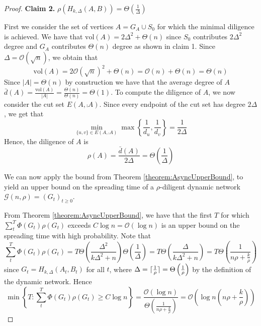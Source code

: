 \begin{proof}

	\textbf{Claim 2.} $\rho(H_{k, \Delta}(A,B)) = \Theta\left(\frac{1}{\Delta}\right)$

	First we consider the set of vertices $A = G_A \cup S_0$ for which the minimal diligence is achieved. %
	We have that $\text{vol}(A) = 2\Delta^2 + \Theta(n)$ since $S_0$ contributes $2\Delta^2$ degree and $G_A$ contributes $\Theta(n)$ degree as shown in claim 1. Since $\Delta = \mathcal{O}(\sqrt{n})$, we obtain that 
	$$
		\text{vol}(A) = 2 \mathcal{O}(\sqrt{n})^2 + \Theta(n) = \mathcal{O}(n) + \Theta(n) = \Theta(n)
	$$ %
	Since $|A| = \Theta(n)$ by construction we have that the average degree of $A$ $\bar{d}(A) = \frac{\text{vol}(A)}{|A|} = \frac{\Theta(n)}{\Theta(n)} = \Theta(1)$. To compute the diligence of $A$, we now consider the cut set $E(A, \comp{A})$. Since every endpoint of the cut set has degree $2\Delta$, we get that 
	$$
		\min_{\{u, v\} \in E(A, \comp{A})} \max \left\{ \frac{1}{d_u}, \frac{1}{d_v} \right\} = \frac{1}{2\Delta}
	$$
	Hence, the diligence of $A$ is 
	$$
		\rho(A) = \frac{\bar{d}(A)}{2\Delta} = \Theta\left(\frac{1}{\Delta}\right)
	$$ 


	We can now apply the bound from Theorem \ref{theorem:AsyncUpperBound}, to yield an upper bound on the spreading time of a $\rho$-diligent dynamic network $\mathcal{G}(n, \rho) = (G_t)_{t\geq 0}$. 
	
	From Theorem \ref{theorem:AsyncUpperBound}, we have that the first $T$ for which $\sum_t^T \Phi(G_t)\rho(G_t)$ exceeds $C \log n = \mathcal{O}(\log n)$ is an upper bound on the spreading time with high probability.  Note that 
	$$
		\sum_t^T \Phi(G_t)\rho(G_t)
		= 
		T \Theta\left(\frac{\Delta^2}{k\Delta^2 +n }\right) \Theta\left(\frac{1}{\Delta}\right)
		= 
		T \Theta\left(\frac{\Delta}{k\Delta^2 +n }\right)
		= 
		T \Theta\left(\frac{1}{n \rho + \frac{k}{\rho}}\right)
	$$
	since $G_t = H_{k, \Delta}(A_t,B_t)$ for all $t$, where $\Delta = \lceil\frac{1}{\rho}\rceil = \Theta\left(\frac{1}{\rho}\right)$ by the definition of the dynamic network. Hence 
	$$
		\min \left\{T : \sum_t^T \Phi(G_t)\rho(G_t) \geq C \log n \right\}
		=
		\frac{\mathcal{O}(\log n)}{\Theta\left(\frac{1}{n \rho + \frac{k}{\rho}}\right)}
		= 
		\mathcal{O}\left(\log n \left(n \rho + \frac{k}{\rho}\right)\right)
	$$
\end{proof}

